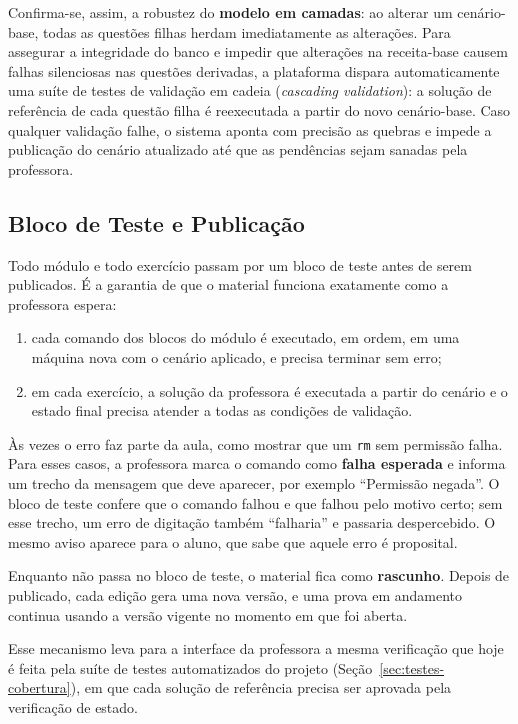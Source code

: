 Confirma-se, assim, a robustez do \textbf{modelo em camadas}: ao alterar um cenário-base, todas as questões filhas herdam imediatamente as alterações. Para assegurar a integridade do banco e impedir que alterações na receita-base causem falhas silenciosas nas questões derivadas, a plataforma dispara automaticamente uma suíte de testes de validação em cadeia (\textit{cascading validation}): a solução de referência de cada questão filha é reexecutada a partir do novo cenário-base. Caso qualquer validação falhe, o sistema aponta com precisão as quebras e impede a publicação do cenário atualizado até que as pendências sejam sanadas pela professora.

\subsection{Bloco de Teste e Publicação}
\label{sec:bloco-teste}

Todo módulo e todo exercício passam por um bloco de teste antes de serem publicados. É a garantia de que o material funciona exatamente como a professora espera:

\begin{enumerate}
    \item cada comando dos blocos do módulo é executado, em ordem, em uma máquina nova com o cenário aplicado, e precisa terminar sem erro;
    \item em cada exercício, a solução da professora é executada a partir do cenário e o estado final precisa atender a todas as condições de validação.
\end{enumerate}

Às vezes o erro faz parte da aula, como mostrar que um \texttt{rm} sem permissão falha. Para esses casos, a professora marca o comando como \textbf{falha esperada} e informa um trecho da mensagem que deve aparecer, por exemplo ``Permissão negada''. O bloco de teste confere que o comando falhou e que falhou pelo motivo certo; sem esse trecho, um erro de digitação também ``falharia'' e passaria despercebido. O mesmo aviso aparece para o aluno, que sabe que aquele erro é proposital.

Enquanto não passa no bloco de teste, o material fica como \textbf{rascunho}. Depois de publicado, cada edição gera uma nova versão, e uma prova em andamento continua usando a versão vigente no momento em que foi aberta.

Esse mecanismo leva para a interface da professora a mesma verificação que hoje é feita pela suíte de testes automatizados do projeto (Seção~\ref{sec:testes-cobertura}), em que cada solução de referência precisa ser aprovada pela verificação de estado.

